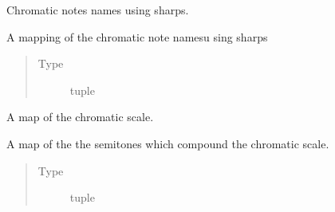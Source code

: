 \documentclass[letterpaper,10pt,english]{sphinxmanual}
\begin{document}
\begin{fulllineitems}
\label{\detokenize{index:birdears.CHROMATIC_SHARP}}
\sphinxAtStartPar
Chromatic notes names using sharps.

\sphinxAtStartPar
A mapping of the chromatic note namesu sing sharps
\begin{quote}\begin{description}
\item[{Type}] \leavevmode
\sphinxAtStartPar
tuple

\end{description}\end{quote}

\end{fulllineitems}


\begin{fulllineitems}
\label{\detokenize{index:birdears.CHROMATIC_TYPE}}
\sphinxAtStartPar
A map of the chromatic scale.

\sphinxAtStartPar
A map of the the semitones which compound the chromatic scale.
\begin{quote}\begin{description}
\item[{Type}] \leavevmode
\sphinxAtStartPar
tuple

\end{description}\end{quote}

\end{fulllineitems}

\end{document}

